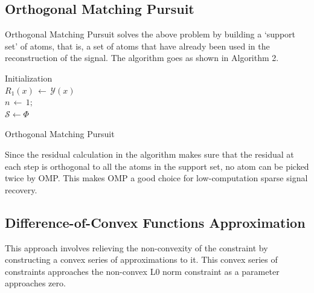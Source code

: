 \documentclass[letterpaper, 10 pt, conference]{article}
\begin{document}
\subsection{Orthogonal Matching Pursuit}
Orthogonal Matching Pursuit solves the above problem by building a `support set' of atoms, that is, a set of atoms that have already been used in the reconstruction of the signal. The algorithm goes as shown in Algorithm 2.

\begin{algorithm}[]
 Initialization\: \\
 $R_1(x)\,\leftarrow\,\mathcal{Y}(x)$ \\
 $n\,\leftarrow\,1;$\\
 $\mathcal{S} \leftarrow \Phi$ \\
 \caption{Orthogonal Matching Pursuit}
\end{algorithm}

Since the residual calculation in the algorithm makes sure that the residual at each step is orthogonal to all the atoms in the support set, no atom can be picked twice by OMP. This makes OMP a good choice for low-computation sparse signal recovery.

\subsection{Difference-of-Convex Functions Approximation}
This approach involves relieving the non-convexity of the constraint by constructing a convex series of approximations to it. This convex series of constraints approaches the non-convex L0 norm constraint as a parameter approaches zero.
\end{document}
